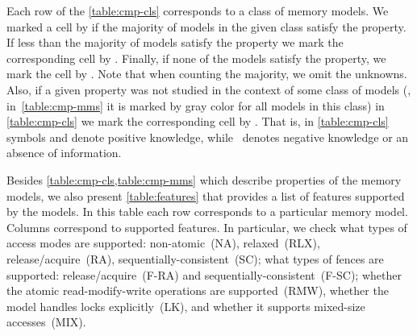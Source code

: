 Each row of the \cref{table:cmp-cls} corresponds to a class of memory models. 
We marked a cell by \cmark\xspace if the majority of models 
in the given class satisfy the property. 
If less than the majority of models satisfy the property we mark 
the corresponding cell by \wmark\xspace.
Finally, if none of the models satisfy the property, we mark the cell by \xmark\xspace. 
Note that when counting the majority, we omit the unknowns.
Also, if a given property was not studied in the context of some class of models 
(\ie, in~\cref{table:cmp-mms} it is marked by gray color for all models in this class)
in \cref{table:cmp-cls} we mark the corresponding cell by \xmark. 
That is, in \cref{table:cmp-cls} symbols \cmark\xspace and \wmark\xspace 
denote positive knowledge,
while~\xmark\xspace denotes negative knowledge or
an absence of information.

Besides \cref{table:cmp-cls,table:cmp-mms} which describe 
properties of the memory models, 
we also present \cref{table:features}
that provides a list of features supported by the models.
In this table each row corresponds to a particular memory model. 
Columns correspond to supported features. 
In particular, we check what types of access modes are supported:
non-atomic~(NA), relaxed~(RLX), release/acquire~(RA), sequentially-consistent~(SC); 
what types of fences are supported: release/acquire~(F-RA) 
and sequentially-consistent~(F-SC);
whether the atomic read-modify-write operations are supported~(RMW),
whether the model handles locks explicitly~(LK),
and whether it supports mixed-size accesses~(MIX). 





